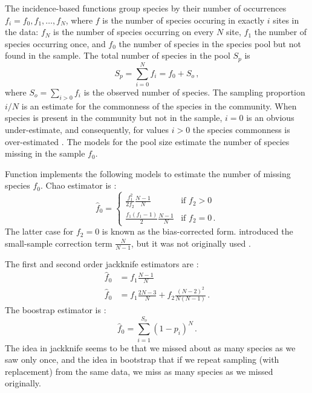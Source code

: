 \documentclass[a4paper,10pt,twocolumn]{article}
\begin{document}
The incidence-based functions group species by their number of
occurrences $f_i = f_0, f_1, \ldots, f_N$, where $f$ is the number of
species occuring in exactly $i$ sites in the data: $f_N$ is the number
of species occurring on every $N$ site, $f_1$ the number of species
occurring once, and $f_0$ the number of species in the species pool
but not found in the sample. The total number of species in the pool
$S_p$ is
\begin{equation}
S_p = \sum_{i=0}^N f_i = f_0+ S_o \,,
\end{equation}
where $S_o = \sum_{i>0} f_i$ is the observed number of species.  The
sampling proportion $i/N$ is an estimate for the commonness of the
species in the community. When species is present in the community but
not in the sample, $i=0$ is an obvious under-estimate, and
consequently, for values $i>0$ the species commonness is
over-estimated \citep{Good53}. The models for the pool size estimate
the number of species missing in the sample $f_0$.

Function  implements the following models to estimate
the number of missing species $f_0$. Chao estimator  is \citep{Chao87, ChiuEtal14}:
\begin{equation}
\label{eq:chao}
\hat f_0 = \begin{cases} 
    \frac{f_1^2}{2 f_2} \frac{N-1}{N} &\text{if } f_2 > 0 \\
\frac{f_1 (f_1 -1)}{2}  \frac{N-1}{N} & \text{if } f_2 = 0 \,.
\end{cases}
\end{equation}
The latter case for $f_2=0$ is known as the bias-corrected
form. \citet{ChiuEtal14} introduced the small-sample correction term
$\frac{N}{N-1}$, but it was not originally used \citep{Chao87}.

The first and second order jackknife estimators are
\citep{SmithVanBelle84}:
\begin{align}
\hat f_0 &=  f_1 \frac{N-1}{N}  \\ 
\hat f_0 & =  f_1 \frac{2N-3}{N}  + f_2 \frac{(N-2)^2}{N(N-1)} \,.
\end{align}
The boostrap estimator is \citep{SmithVanBelle84}:
\begin{equation}
\hat f_0 =  \sum_{i=1}^{S_o} (1-p_i)^N \,.
\end{equation}
The idea in jackknife seems to be that we missed about as many species
as we saw only once, and the idea in bootstrap that if we repeat
sampling (with replacement) from the same data, we miss as many
species as we missed originally.
\end{document}
